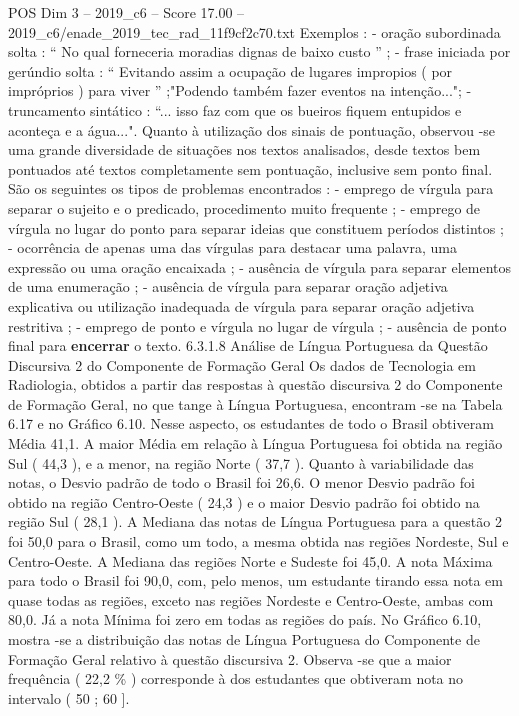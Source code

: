 \begin{textsample}{POS Dim 3 – 2019\_c6 – Score 17.00 – 2019\_c6/enade\_2019\_tec\_rad\_11f9cf2c70.txt}
Exemplos : - oração subordinada solta : “ No qual forneceria moradias dignas de baixo custo ” ; - frase iniciada por gerúndio solta : “ Evitando assim a ocupação de lugares impropios ( por impróprios ) para viver ” ;"Podendo também fazer eventos na intenção..."; - truncamento sintático : “... isso faz com que os bueiros fiquem entupidos e aconteça e a água...".
Quanto à utilização dos sinais de pontuação, observou -se uma grande diversidade de situações nos textos analisados, desde textos bem pontuados até textos completamente sem pontuação, inclusive sem ponto final.
São os seguintes os tipos de problemas encontrados : - emprego de vírgula para separar o sujeito e o predicado, procedimento muito frequente ; - emprego de vírgula no lugar do ponto para separar ideias que constituem períodos distintos ; - ocorrência de apenas uma das vírgulas para destacar uma palavra, uma expressão ou uma oração encaixada ; - ausência de vírgula para separar elementos de uma enumeração ; - ausência de vírgula para separar oração adjetiva explicativa ou utilização inadequada de vírgula para separar oração adjetiva restritiva ; - emprego de ponto e vírgula no lugar de vírgula ; - ausência de ponto final para \textbf{encerrar} o texto. 6.3.1.8 Análise de Língua Portuguesa da Questão Discursiva 2 do Componente de Formação Geral Os dados de Tecnologia em Radiologia, obtidos a partir das respostas à questão discursiva 2 do Componente de Formação Geral, no que tange à Língua Portuguesa, encontram -se na Tabela 6.17 e no Gráfico 6.10.
Nesse aspecto, os estudantes de todo o Brasil obtiveram Média 41,1.
A maior Média em relação à Língua Portuguesa foi obtida na região Sul ( 44,3 ), e a menor, na região Norte ( 37,7 ).
Quanto à variabilidade das notas, o Desvio padrão de todo o Brasil foi 26,6.
O menor Desvio padrão foi obtido na região Centro-Oeste ( 24,3 ) e o maior Desvio padrão foi obtido na região Sul ( 28,1 ).
A Mediana das notas de Língua Portuguesa para a questão 2 foi 50,0 para o Brasil, como um todo, a mesma obtida nas regiões Nordeste, Sul e Centro-Oeste.
A Mediana das regiões Norte e Sudeste foi 45,0.
A nota Máxima para todo o Brasil foi 90,0, com, pelo menos, um estudante tirando essa nota em quase todas as regiões, exceto nas regiões Nordeste e Centro-Oeste, ambas com 80,0.
Já a nota Mínima foi zero em todas as regiões do país.
No Gráfico 6.10, mostra -se a distribuição das notas de Língua Portuguesa do Componente de Formação Geral relativo à questão discursiva 2.
Observa -se que a maior frequência ( 22,2 \% ) corresponde à dos estudantes que obtiveram nota no intervalo ( 50 ; 60 ].

\end{textsample}
